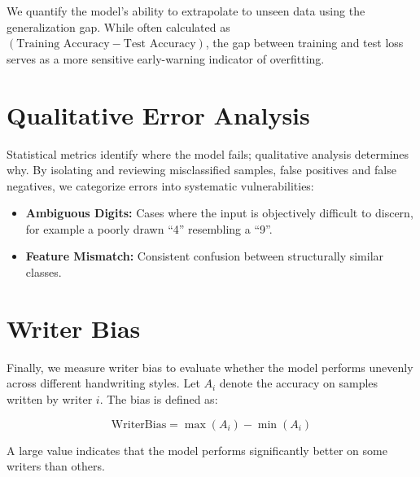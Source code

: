 \documentclass[11pt]{article}
\begin{document}
We quantify the model's ability to extrapolate to unseen data using the generalization gap. While often calculated as $(\text{Training Accuracy} - \text{Test Accuracy})$, the gap between training and test loss serves as a more sensitive early-warning indicator of overfitting.

\section{Qualitative Error Analysis}

Statistical metrics identify where the model fails; qualitative analysis determines why. By isolating and reviewing misclassified samples, false positives and false negatives, we categorize errors into systematic vulnerabilities:

\begin{itemize}
	\item \textbf{Ambiguous Digits:} Cases where the input is objectively difficult to discern, for example a poorly drawn ``4'' resembling a ``9''.
	\item \textbf{Feature Mismatch:} Consistent confusion between structurally similar classes.
\end{itemize}

\section{Writer Bias}

Finally, we measure writer bias to evaluate whether the model performs unevenly across different handwriting styles. Let $A_i$ denote the accuracy on samples written by writer $i$. The bias is defined as:

$$
\mathrm{WriterBias} = \max(A_i) - \min(A_i)
$$

A large value indicates that the model performs significantly better on some writers than others.
\end{document}
